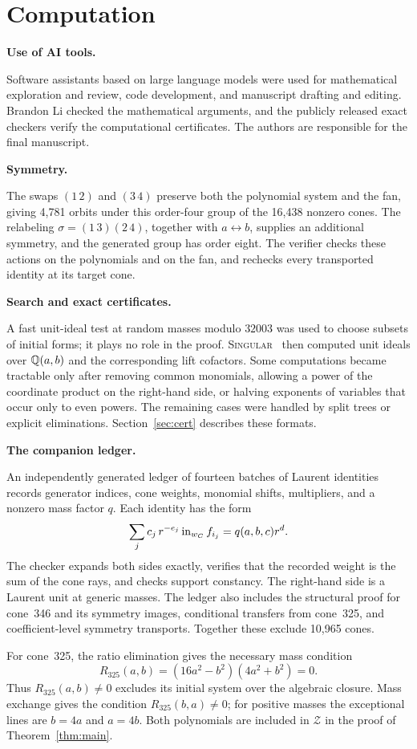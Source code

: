 \documentclass[11pt]{amsart}
\newcommand{\topic}[1]{\par\addvspace{1.4ex}\noindent\textbf{#1}\par\nobreak\smallskip\noindent}
\theoremstyle{definition}\newtheorem{definition}[theorem]{Definition}\theoremstyle{remark}\newtheorem{remark}[theorem]{Remark}
\begin{document}
\section{Computation}\label{sec:comp}
\topic{Use of AI tools.} Software assistants based on large language models were used for mathematical exploration and review, code development, and manuscript drafting and editing. Brandon Li checked the mathematical arguments, and the publicly released exact checkers verify the computational certificates. The authors are responsible for the final manuscript.

\topic{Symmetry.} The swaps $(1\,2)$ and $(3\,4)$ preserve both the polynomial system and the fan, giving 4,781 orbits under this order-four group of the 16,438 nonzero cones. The relabeling $\sigma=(1\,3)(2\,4)$, together with $a\leftrightarrow b$, supplies an additional symmetry, and the generated group has order eight. The verifier checks these actions on the polynomials and on the fan, and rechecks every transported identity at its target cone.

\topic{Search and exact certificates.} A fast unit-ideal test at random masses modulo $32003$ was used to choose subsets of initial forms; it plays no role in the proof. \textsc{Singular}~\citep{Sing} then computed unit ideals over $\mathbb{Q}(a,b)$ and the corresponding lift cofactors. Some computations became tractable only after removing common monomials, allowing a power of the coordinate product on the right-hand side, or halving exponents of variables that occur only to even powers. The remaining cases were handled by split trees or explicit eliminations. Section~\ref{sec:cert} describes these formats.

\topic{The companion ledger.} An independently generated ledger of fourteen batches of Laurent identities records generator indices, cone weights, monomial shifts, multipliers, and a nonzero mass factor $q$. Each identity has the form
\[
 \sum_j c_j\,r^{-e_j}\operatorname{in}_{w_C}f_{i_j}=q(a,b,c)r^d.
\]
The checker expands both sides exactly, verifies that the recorded weight is the sum of the cone rays, and checks support constancy. The right-hand side is a Laurent unit at generic masses. The ledger also includes the structural proof for cone~346 and its symmetry images, conditional transfers from cone~325, and coefficient-level symmetry transports. Together these exclude 10,965 cones.

For cone~325, the ratio elimination gives the necessary mass condition
\begin{equation}\label{eq:transfer325}
R_{325}(a,b)=(16a^2-b^2)(4a^2+b^2)=0.
\end{equation}
Thus $R_{325}(a,b)\ne0$ excludes its initial system over the algebraic closure. Mass exchange gives the condition $R_{325}(b,a)\ne0$; for positive masses the exceptional lines are $b=4a$ and $a=4b$. Both polynomials are included in $\mathcal Z$ in the proof of Theorem~\ref{thm:main}.
\end{document}
